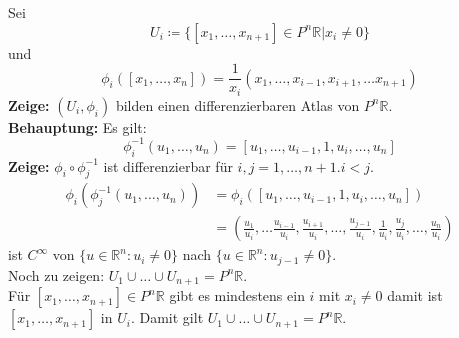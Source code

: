 \begin{problem}[3a]
  Sei 
  \begin{equation*} 
    U_i \coloneqq \{ [x_1, \dots , x_{n+1}] \in P^n\mathbb{R} | x_i \neq 0 \}
  \end{equation*}
  und 
  \begin{equation*}
    \phi_i ([x_1, \dots , x_{n}]) = \frac{1}{x_i}(x_1, \dots , x_{i-1},x_{i+1}, \dots x_{n+1})
  \end{equation*}
  \textbf{Zeige:} \( (U_i, \phi_i) \) bilden einen differenzierbaren Atlas von \( P^n\mathbb{R} \). \\
  \textbf{Behauptung:} Es gilt:
  \begin{equation*}
    \phi_i^{-1} (u_1, \dots , u_{n}) = [u_1, \dots , u_{i-1}, 1, u_i, \dots , u_n]
  \end{equation*}
  \textbf{Zeige:} \( \phi_i \circ \phi^{-1}_j \) ist differenzierbar für \( i,j = 1, \dots, n+1. i < j \).
  \begin{align*}
    \phi_i (\phi_j^{-1} (u_1, \dots , u_{n})) &= \phi_i([u_1, \dots , u_{i-1}, 1, u_i, \dots , u_n]) \\
    &= \left( 
    \frac{u_1}{u_i}, \dots \frac{u_{i-1}}{u_i}, \frac{u_{i+1}}{u_i}, \dots , \frac{u_{j-1}}{u_i}, \frac{1}{u_i}, \frac{u_{j}}{u_i}, \dots, \frac{u_n}{u_i} 
    \right)
  \end{align*}
  ist \( C^{\infty} \) von \( \{ u \in \mathbb{R}^n : u_i \neq 0 \} \) nach \( \{ u \in \mathbb{R}^n : u_{j-1} \neq 0 \} \). \\
  Noch zu zeigen: \( U_1 \cup \dots \cup U_{n+1} = P^n\mathbb{R} \). \\
  Für \( [x_1, \dots , x_{n+1}] \in P^n\mathbb{R} \) gibt es mindestens ein \( i \) mit \( x_i \neq 0 \) damit ist \( [x_1, \dots , x_{n+1}] \) in \( U_i \). Damit gilt \( U_1 \cup \dots \cup U_{n+1} = P^n\mathbb{R} \). 
\end{problem}

